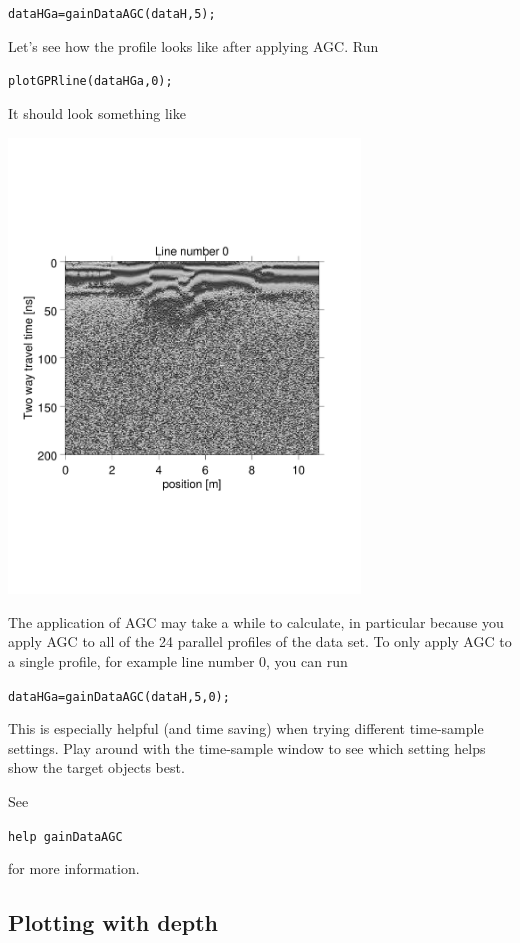 \documentclass[11pt]{article}
\begin{document}
\qquad \verb#dataHGa=gainDataAGC(dataH,5);#

Let's see how the profile looks like after applying
AGC. Run

\qquad \verb#plotGPRline(dataHGa,0);#

It should look something like
\begin{center}
\includegraphics[width=0.7\textwidth, trim = 0.9cm 6cm 2cm
  6.5cm,clip]{figures/GPRlineHGa0}
\end{center}

The application of AGC may take a while to calculate, in particular
because you apply AGC to all of the 24 parallel profiles of the data set. To
only apply AGC to a single profile, for example line number 0, you can
run

\qquad \verb#dataHGa=gainDataAGC(dataH,5,0);#

This is especially helpful (and time saving) when trying different
time-sample settings. Play around with the time-sample window to see
which setting helps show the target objects best.

See

\qquad \verb#help gainDataAGC#

for more information.


\subsection{Plotting with depth}
\end{document}
